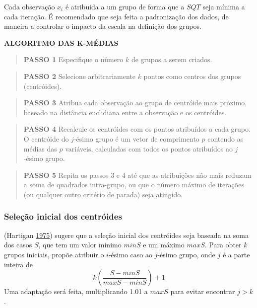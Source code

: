 \documentclass[
]{book}
\theoremstyle{definition}
\theoremstyle{definition}
\theoremstyle{definition}
\theoremstyle{remark}
\begin{document}
Cada observação \(x_i\) é atribuída a um grupo de forma que a \(SQT\) seja mínima a cada iteração. É recomendado que seja feita a padronização dos dados, de maneira a controlar o impacto da escala na definição dos grupos.

\textbf{ALGORITMO DAS K-MÉDIAS}

\begin{quote}
\textbf{PASSO 1} Especifique o número \(k\) de grupos a serem criados.
\end{quote}

\begin{quote}
\textbf{PASSO 2} Selecione arbitrariamente \(k\) pontos como centros dos grupos (centróides).
\end{quote}

\begin{quote}
\textbf{PASSO 3} Atribua cada observação ao grupo de centróide mais próximo, baseado na distância euclidiana entre a observação e os centróides.
\end{quote}

\begin{quote}
\textbf{PASSO 4} Recalcule os centróides com os pontos atribuídos a cada grupo. O centróide do \(j\)-ésimo grupo é um vetor de comprimento \(p\) contendo as médias das \(p\) variáveis, calculadas com todos os pontos atribuídos ao \(j\)-ésimo grupo.
\end{quote}

\begin{quote}
\textbf{PASSO 5} Repita os passos 3 e 4 até que as atribuições não mais reduzam a soma de quadrados intra-grupo, ou que o número máximo de iterações (ou qualquer outro critério de parada) seja atingido.
\end{quote}

\hypertarget{seleuxe7uxe3o-inicial-dos-centruxf3ides}{%
\subsubsection*{Seleção inicial dos centróides}\label{seleuxe7uxe3o-inicial-dos-centruxf3ides}}

(Hartigan \protect\hyperlink{ref-hartigan1975clustering}{1975}) sugere que a seleção inicial dos centróides seja baseada na soma dos casos \(S\), que tem um valor mínimo \(minS\) e um máximo \(maxS\). Para obter \(k\) grupos iniciais, propõe atribuir o \(i\)-ésimo caso ao \(j\)-ésimo grupo, onde \(j\) é a parte inteira de
\begin{equation}
k \left( \dfrac{S-minS}{maxS-minS} \right) + 1
\label{eq:j}
\end{equation}
Uma adaptação será feita, multiplicando 1.01 a \(maxS\) para evitar encontrar \(j>k\).
\end{document}
